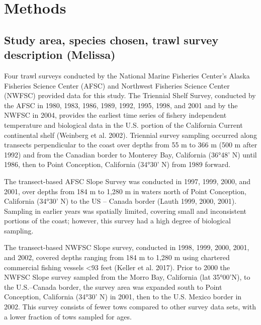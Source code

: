 \documentclass[
]{article}
\begin{document}
\hypertarget{methods}{%
\section{Methods}\label{methods}}

\hypertarget{study-area-species-chosen-trawl-survey-description-melissa}{%
\subsection{Study area, species chosen, trawl survey description
(Melissa)}\label{study-area-species-chosen-trawl-survey-description-melissa}}

Four trawl surveys conducted by the National Marine Fisheries Center's
Alaska Fisheries Science Center (AFSC) and Northwest Fisheries Science
Center (NWFSC) provided data for this study. The Triennial Shelf Survey,
conducted by the AFSC in 1980, 1983, 1986, 1989, 1992, 1995, 1998, and
2001 and by the NWFSC in 2004, provides the earliest time series of
fishery independent temperature and biological data in the U.S. portion
of the California Current continental shelf (Weinberg et al. 2002).
Triennial survey sampling occurred along transects perpendicular to the
coast over depths from 55 m to 366 m (500 m after 1992) and from the
Canadian border to Monterey Bay, California (36°48' N) until 1986, then
to Point Conception, California (34°30' N) from 1989 forward.

The transect-based AFSC Slope Survey was conducted in 1997, 1999, 2000,
and 2001, over depths from 184 m to 1,280 m in waters north of Point
Conception, California (34°30' N) to the US -- Canada border (Lauth
1999, 2000, 2001). Sampling in earlier years was spatially limited,
covering small and inconsistent portions of the coast; however, this
survey had a high degree of biological sampling.

The transect-based NWFSC Slope survey, conducted in 1998, 1999, 2000,
2001, and 2002, covered depths ranging from 184 m to 1,280 m using
chartered commercial fishing vessels \textless93 feet (Keller et al.
2017). Prior to 2000 the NWFSC Slope survey sampled from the Morro Bay,
California (lat 35°00'N), to the U.S.--Canada border, the survey area
was expanded south to Point Conception, California (34°30' N) in 2001,
then to the U.S. Mexico border in 2002. This survey consists of fewer
tows compared to other survey data sets, with a lower fraction of tows
sampled for ages.
\end{document}
